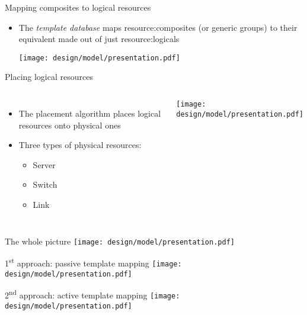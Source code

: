 \begin{frame}{Mapping composites to logical resources}
    \begin{itemize}
        \item The \textit{template database} maps \glspl{resource:composite} (or generic groups) to their equivalent made out of just \glspl{resource:logical}
        \begin{center}
            \texttt{[image: design/model/presentation.pdf]}
        \end{center}
    \end{itemize}
\end{frame}

\begin{frame}{Placing logical resources}
    \begin{columns}[T,onlytextwidth]
        \begin{itemize}
            \item The placement algorithm places logical resources onto physical ones
            \item Three types of physical resources:
            \begin{itemize}
                \item Server
                \item Switch
                \item Link
            \end{itemize}
        \end{itemize}
        \texttt{[image: design/model/presentation.pdf]}
    \end{columns}
\end{frame}

\begin{frame}{The whole picture}
    \centering
    \texttt{[image: design/model/presentation.pdf]}
\end{frame}

\begin{frame}{1\textsuperscript{st} approach: passive template mapping}
    \centering
    \texttt{[image: design/model/presentation.pdf]}
\end{frame}

\begin{frame}{2\textsuperscript{nd} approach: active template mapping}
    \centering
    \texttt{[image: design/model/presentation.pdf]}
\end{frame}
